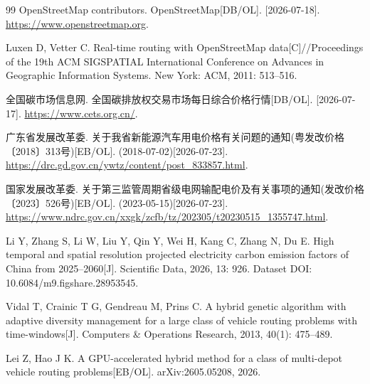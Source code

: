 \documentclass{setp-new}
\begin{document}
\begin{thebibliography}{99}
 OpenStreetMap contributors. OpenStreetMap[DB/OL]. [2026-07-18]. \url{https://www.openstreetmap.org}.

 Luxen D, Vetter C. Real-time routing with OpenStreetMap data[C]//Proceedings of the 19th ACM SIGSPATIAL International Conference on Advances in Geographic Information Systems. New York: ACM, 2011: 513--516.

 全国碳市场信息网. 全国碳排放权交易市场每日综合价格行情[DB/OL]. [2026-07-17]. \url{https://www.cets.org.cn/}.

 广东省发展改革委. 关于我省新能源汽车用电价格有关问题的通知(粤发改价格〔2018〕313号)[EB/OL]. (2018-07-02)[2026-07-23].
\url{https://drc.gd.gov.cn/ywtz/content/post_833857.html}.

 国家发展改革委. 关于第三监管周期省级电网输配电价及有关事项的通知(发改价格〔2023〕526号)[EB/OL]. (2023-05-15)[2026-07-23].
\url{https://www.ndrc.gov.cn/xxgk/zcfb/tz/202305/t20230515_1355747.html}.

 Li Y, Zhang S, Li W, Liu Y, Qin Y, Wei H, Kang C, Zhang N, Du E. High temporal and spatial resolution projected electricity carbon emission factors of China from 2025--2060[J]. Scientific Data, 2026, 13: 926. Dataset DOI: 10.6084/m9.figshare.28953545.

 Vidal T, Crainic T G, Gendreau M, Prins C. A hybrid genetic algorithm with adaptive diversity management for a large class of vehicle routing problems with time-windows[J]. Computers \& Operations Research, 2013, 40(1): 475--489.

 Lei Z, Hao J K. A GPU-accelerated hybrid method for a class of multi-depot vehicle routing problems[EB/OL]. arXiv:2605.05208, 2026.

\end{thebibliography}
\end{document}
